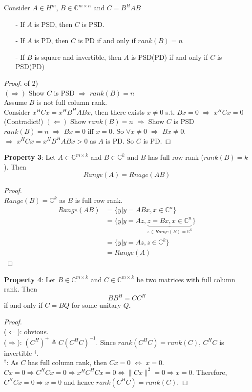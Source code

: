 \begin{multicols}{2}
\begin{theorem}
    Consider $A\in H^m$, $B\in\mathbb{C}^{m\times n}$ and $C=B^HAB$
    \begin{itemize}
        \item [-] If $A$ is PSD, then $C$ is PSD.
        \item [-] If $A$ is PD, then $C$ is PD if and only if $rank(B)=n$
        \item [-] If $B$ is square and invertible, then $A$ is PSD(PD) if and only if $C$ is PSD(PD)
    \end{itemize}
\end{theorem}
\begin{proof} of 2)\\
    $(\Longrightarrow)$ Show $C$ is PSD $\Longrightarrow$ $rank(B)=n$\\
    Assume $B$ is not full column rank.\\
    Consider $x^HCx=x^HB^HABx$, then there exists $x\neq 0$ s.t. $Bx=0$ $\Longrightarrow$ $x^HCx=0$ (Contradict!)
    $(\Longleftarrow)$ Show $rank(B)=n$ $\Longrightarrow$ Show $C$ is PSD \\
    $rank(B)=n$ $\Longrightarrow$ $Bx=0$ iff $x=0$. So $\forall x\neq 0$ $\Longrightarrow$ $Bx\neq 0$. \\
    $\Longrightarrow$ $x^HCx = x^HB^H A Bx > 0$ as $A$ is PD. So $C$ is PD.
\end{proof}

\textbf{Property 3}: Let $A\in\mathbb{C}^{m\times k}$ and $B\in\mathbb{C}^{k}$ and $B$ has full row rank ($rank(B)=k$). Then 
\[
    Range(A) = Rnage(AB)
\]
\begin{proof} \\
    $Range(B)=\mathbb{C}^k$ as $B$ is full row rank.
    \[
        \begin{array}{ll}
            Range(AB) &= \{ y|y=ABx, x\in\mathbb{C}^n \} \\
            &= \{ y | y=Az, \underbrace{z=Bx,x\in\mathbb{C}^n}_{z\in Range(B)=\mathbb{C}^k} \} \\
            &= \{ y | y=Az, z\in\mathbb{C}^k \} \\
            &= Range(A)
        \end{array}
    \]
\end{proof}

\textbf{Property 4}: Let $B\in\mathbb{C}^{m\times k}$ and $C\in\mathbb{C}^{m\times k}$ be two matrices with full column rank. Then
\[
    BB^H=CC^H
\]
if and only if $C=BQ$ for some unitary $Q$.
\begin{proof} \\
    ($\Longleftarrow$): obvious. \\
    ($\Longrightarrow$): $(C^H)^{+}\triangleq C(C^HC)^{-1}$. Since $rank(C^HC)=rank(C)$, $C^HC$ is invertible $^\dagger$. \\
    $^\dagger$: As $C$ has full column rank, then $Cx=0$ $\Longleftrightarrow$ $x=0$. 
    $Cx=0 \Longrightarrow C^HCx=0 \Longrightarrow x^HC^HCx=0 \Longleftrightarrow \|Cx\|^2=0 \Longrightarrow x=0$. Therefore, $C^HCx=0\Longrightarrow x=0$ and hence $rank(C^HC)=rank(C)$.


\end{proof}
\end{multicols}

